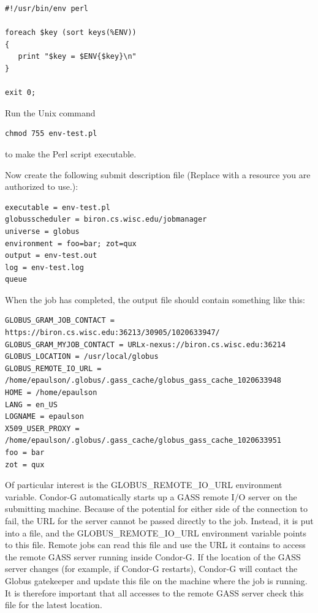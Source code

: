 \begin{verbatim}
#!/usr/bin/env perl

foreach $key (sort keys(%ENV))
{
   print "$key = $ENV{$key}\n"
}

exit 0;
\end{verbatim}

Run the Unix command
\begin{verbatim}
chmod 755 env-test.pl
\end{verbatim}
to make the Perl script executable.

Now create the following submit description file
(Replace  with a resource
you are authorized to use.):

\footnotesize
\begin{verbatim}
executable = env-test.pl
globusscheduler = biron.cs.wisc.edu/jobmanager
universe = globus
environment = foo=bar; zot=qux
output = env-test.out
log = env-test.log
queue
\end{verbatim}
\normalsize

When the job has completed, the output file 
should contain something like this:

\footnotesize
\begin{verbatim}
GLOBUS_GRAM_JOB_CONTACT = https://biron.cs.wisc.edu:36213/30905/1020633947/
GLOBUS_GRAM_MYJOB_CONTACT = URLx-nexus://biron.cs.wisc.edu:36214
GLOBUS_LOCATION = /usr/local/globus
GLOBUS_REMOTE_IO_URL = /home/epaulson/.globus/.gass_cache/globus_gass_cache_1020633948
HOME = /home/epaulson
LANG = en_US
LOGNAME = epaulson
X509_USER_PROXY = /home/epaulson/.globus/.gass_cache/globus_gass_cache_1020633951
foo = bar
zot = qux
\end{verbatim}
\normalsize


Of particular interest is the GLOBUS\_REMOTE\_IO\_URL environment variable.
Condor-G automatically starts up a GASS remote I/O
server on the submitting machine.
Because of the potential for either side of the connection to fail,
the URL for the server cannot be passed directly to the job.
Instead, it is put into a file, and the GLOBUS\_REMOTE\_IO\_URL
environment variable points to this file. 
Remote jobs can read this file and use the URL it contains
to access the remote GASS server running inside Condor-G.
If the location
of the GASS server changes (for example, if Condor-G restarts),
Condor-G will contact the Globus gatekeeper and update this file on
the machine where the job is running.
It is therefore important that all accesses to
the remote GASS server check this file for the latest location.

